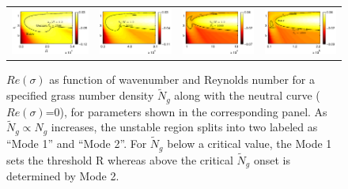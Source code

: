 \documentclass[aps,prl,reprint,twocolumn,showpacs,superscriptaddress,10pt]{revtex4-1}  %
\newcommand{\Rey}{\text{R}}
\newcommand{\Ndg}{\tilde{N}_g}
\begin{document}
\begin{figure}
\begin{tabular}{cccc}
{\includegraphics[scale = 0.68]{Set6_dens32_imgsc}} &
{\includegraphics[scale = 0.68]{Set6_dens34_imgsc}} &
{\includegraphics[scale = 0.68]{Set6_dens36_imgsc}} &
{\includegraphics[scale = 0.68]{Set6_dens38_imgsc}}
\end{tabular}
\caption{$Re(\sigma)$ as function of wavenumber and Reynolds number for a specified grass number density $\Ndg$ along with the neutral curve ($Re(\sigma)$=0), for parameters shown in the corresponding panel.  
As $\Ndg \propto N_g$ increases, the unstable region splits into two labeled as ``Mode 1'' and ``Mode 2''. 
For $\Ndg$ below a critical value, the Mode 1 sets the threshold $\Rey$ whereas above the critical $\Ndg$ onset is determined by Mode 2.}
\label{K_Re_sigma_set3}
\end{figure}
\end{document}
